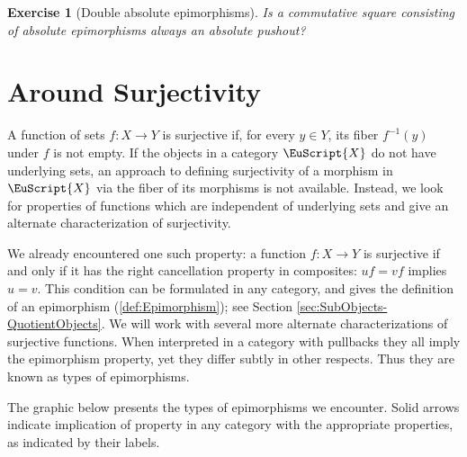 \documentclass [12pt,oneside]{book}%
\theoremstyle{captionstyle}  %
\newtheorem{exercise}[theorem]{Exercise}
\newenvironment{exercises}{%
	\def\FrameCommand{{\color{Maroon}\vrule width 0pt}\hspace{0pt}\fboxsep=\FrameSep}%
	\MakeFramed{\hsize=0.95\linewidth\advance\hsize-\width\FrameRestore%
		\bigskip
		\textbf{Exercises}\vspace{-2ex}\footnotesize{
		}}
}
{\endMakeFramed}
\newcommand{\from}{\colon}				%
\newcommand{\Ctgry}[1]{\EuScript{#1}}					%
\begin{document}
\begin{exercises}
\begin{exercise}[Double absolute epimorphisms]\label{exe:DoubleAbsoluteEpi}
    Is a commutative square consisting of absolute epimorphisms always an absolute pushout?
\end{exercise}
\end{exercises}

\section{Around Surjectivity}
\label{sec:Surjectivity}

A function of sets $f\from X\to Y$ is surjective if, for every $y\in Y$, its fiber $f^{-1}(y)$ under $f$ is not empty. If the objects in a category $\Ctgry{X}$ do not have underlying sets, an approach to defining surjectivity of a morphism in $\Ctgry{X}$ via the fiber of its morphisms is not available. Instead, we look for properties of functions which are independent of underlying sets and give an alternate characterization of surjectivity.

We already encountered one such property: a function $f\from X\to Y$ is surjective if and only if it has the right cancellation property in composites: $uf=vf$ implies $u=v$. This condition can be formulated in any category, and gives the definition of an epimorphism (\ref{def:Epimorphism}); see Section \ref{sec:SubObjects-QuotientObjects}. We will work with several more alternate characterizations of surjective functions. When interpreted in a category with pullbacks they all imply the epimorphism property, yet they differ subtly in other respects. Thus they are known as types of epimorphisms.

The graphic below presents the types of epimorphisms we encounter. Solid arrows indicate implication of property in any category with the appropriate properties, as indicated by their labels.
\end{document}
